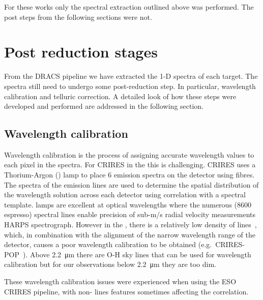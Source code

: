 For these works only the spectral extraction outlined above was performed. The post  steps from the following sections were not.


\section{Post reduction stages}
\label{sec:posreduction}
From the DRACS pipeline we have extracted the 1-D spectra of each target. The spectra still need to undergo some post-reduction step. In particular, wavelength calibration and telluric correction. A detailed look of how these steps were developed and performed are addressed in the following section.

\subsection{Wavelength calibration}
\label{subsec:wavecalib}
Wavelength calibration is the process of assigning accurate wavelength values to each pixel in the spectra. For CRIRES in the \nir{} this is challenging. CRIRES uses a Thorium-Argon (\thar) lamp to place 6 emission spectra on the detector using fibres. The spectra of the \thar{} emission lines are used to determine the spatial distribution of the wavelength solution across each detector using correlation with a spectral template. \thar{} lamps are excellent at optical wavelengths where the numerous (8600 espresso) spectral lines enable precision of sub-m/s radial velocity measurements HARPS spectrograph. However in the \nir{}, there is a relatively low density of \thar{} lines~\citep{kerber_laboratory_2009}, which, in combination with the alignment of the narrow wavelength range of the detector, causes a poor wavelength calibration to be obtained (e.g.\ CRIRES-POP~\citep{nicholls_crirespop_2017}).
Above 2.2~\si{\micro\meter} there are {O-H} sky lines that can be used for wavelength calibration but for our observations below 2.2~\si{\micro\meter} they are too dim.

These wavelength calibration issues were experienced when using the ESO CRIRES pipeline, with non-\thar{} lines features sometimes affecting the correlation.

